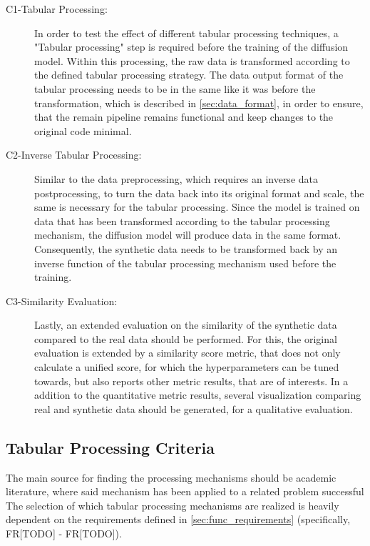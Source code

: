 \begin{description}
    \item[C1-Tabular Processing:] In order to test the effect of different tabular processing techniques, a "Tabular processing" step is required before the training of the diffusion model.
    Within this processing, the raw data is transformed according to the defined tabular processing strategy.
    The data output format of the tabular processing needs to be in the same like it was before the transformation, which is described in \autoref{sec:data_format}, in order to ensure, 
    that the remain pipeline remains functional and keep changes to the original code minimal.
    \item[C2-Inverse Tabular Processing:] Similar to the data preprocessing, which requires an inverse data postprocessing, to turn the data back into its original format and scale, the same is necessary for the tabular processing.
    Since the model is trained on data that has been transformed according to the tabular processing mechanism, the diffusion model will produce data in the same format.
    Consequently, the synthetic data needs to be transformed back by an inverse function of the tabular processing mechanism used before the training.
    \item[C3-Similarity Evaluation:] Lastly, an extended evaluation on the similarity of the synthetic data compared to the real data should be performed.
    For this, the original evaluation is extended by a similarity score metric, that does not only calculate a unified score, for which the hyperparameters can be tuned towards,
    but also reports other metric results, that are of interests.
    In a addition to the quantitative metric results, several visualization comparing real and synthetic data should be generated, for a qualitative evaluation.
\end{description}



\subsection{Tabular Processing Criteria}
\label{ch:Concept-criteria}

The main source for finding the processing mechanisms should be academic literature, where said mechanism has been applied to a related problem successful
The selection of which tabular processing mechanisms are realized is heavily dependent on the requirements defined in \autoref{sec:func_requirements} (specifically, FR[TODO] - FR[TODO]).

